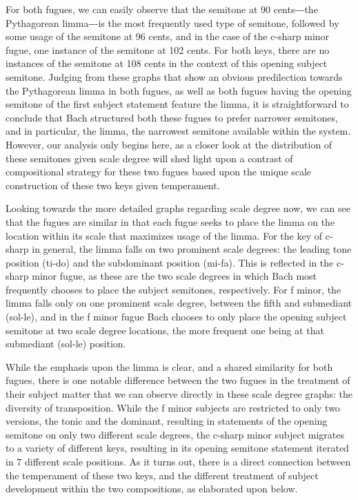     \begin{center}
    \end{center}
    

    \begin{center}
    \end{center}
    
    For both fugues, we can easily observe that the semitone at 90
cents-\/-\/-the Pythagorean limma-\/-\/-is the most frequently used type
of semitone, followed by some usage of the semitone at 96 cents, and in
the case of the c-sharp minor fugue, one instance of the semitone at 102
cents. For both keys, there are no instances of the semitone at 108
cents in the context of this opening subject semitone. Judging from
these graphs that show an obvious predilection towards the Pythagorean
limma in both fugues, as well as both fugues having the opening semitone
of the first subject statement feature the limma, it is straightforward
to conclude that Bach structured both these fugues to prefer narrower
semitones, and in particular, the limma, the narrowest semitone
available within the system. However, our analysis only begins here, as
a closer look at the distribution of these semitones given scale degree
will shed light upon a contrast of compositional strategy for these two
fugues based upon the unique scale construction of these two keys given
temperament.

Looking towards the more detailed graphs regarding scale degree now, we
can see that the fugues are similar in that each fugue seeks to place
the limma on the location within its scale that maximizes usage of the
limma. For the key of c-sharp in general, the limma falls on two
prominent scale degrees: the leading tone position (ti-do) and the
subdominant position (mi-fa). This is reflected in the c-sharp minor
fugue, as these are the two scale degrees in which Bach most frequently
chooses to place the subject semitones, respectively. For f minor, the
limma falls only on one prominent scale degree, between the fifth and
submediant (sol-le), and in the f minor fugue Bach chooses to only place
the opening subject semitone at two scale degree locations, the more
frequent one being at that submediant (sol-le) position.

While the emphasis upon the limma is clear, and a shared similarity for
both fugues, there is one notable difference between the two fugues in
the treatment of their subject matter that we can observe directly in
these scale degree graphs: the diversity of transposition. While the f
minor subjects are restricted to only two versions, the tonic and the
dominant, resulting in statements of the opening semitone on only two
different scale degrees, the c-sharp minor subject migrates to a variety
of different keys, resulting in its opening semitone statement iterated
in 7 different scale positions. As it turns out, there is a direct
connection between the temperament of these two keys, and the different
treatment of subject development within the two compositions, as
elaborated upon below.

